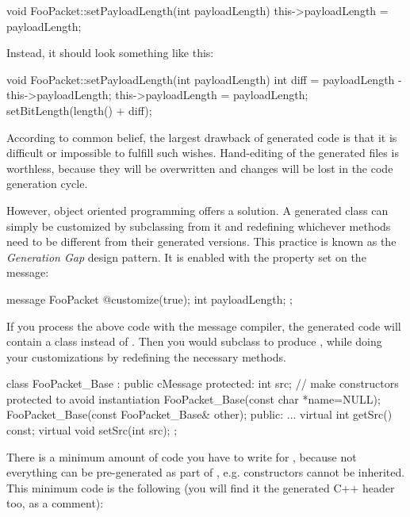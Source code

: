 \begin{cpp}
void FooPacket::setPayloadLength(int payloadLength)
{
    this->payloadLength = payloadLength;
}
\end{cpp}

Instead, it should look something like this:

\begin{cpp}
void FooPacket::setPayloadLength(int payloadLength)
{
    int diff = payloadLength - this->payloadLength;
    this->payloadLength = payloadLength;
    setBitLength(length() + diff);
}
\end{cpp}

According to common belief, the largest drawback of generated code
is that it is difficult or impossible to fulfill such wishes.
Hand-editing of the generated files is worthless, because
they will be overwritten and changes will be lost
in the code generation cycle.

However, object oriented programming offers a solution.
A generated class can simply be customized by subclassing
from it and redefining whichever methods need to be
different from their generated versions. This practice
is known as the \textit{Generation Gap} design pattern.
It is enabled with the  property set on the
message:

\begin{msg}
message FooPacket
{
   @customize(true);
   int payloadLength;
};
\end{msg}

If you process the above code with the message compiler,
the generated code will contain a  class
instead of . Then you would subclass
 to produce ,
while doing your customizations by redefining the necessary methods.

\begin{cpp}
class FooPacket_Base : public cMessage
{
  protected:
    int src;
    // make constructors protected to avoid instantiation
    FooPacket_Base(const char *name=NULL);
    FooPacket_Base(const FooPacket_Base& other);
  public:
    ...
    virtual int getSrc() const;
    virtual void setSrc(int src);
};
\end{cpp}

There is a minimum amount of code you have to write
for , because not everything can be
pre-generated as part of , e.g.
constructors cannot be inherited. This minimum
code is the following (you will find it the generated C++ header
too, as a comment):

